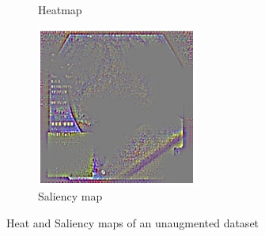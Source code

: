 \begin{figure}
\begin{subfigure}[t]{0.3\textwidth}
         \caption{Heatmap}
         \label{fig:sal2}
     \end{subfigure}     
     \hfill
     \begin{subfigure}[t]{0.3\textwidth}
         \centering
         \includegraphics[width=\textwidth]{methodology/figures/sal3.png}
         \caption{Saliency map}
         \label{fig:sal3}
     \end{subfigure}
     \caption{Heat and Saliency maps of an unaugmented dataset}
     \label{fig:Saliencymasks}
\end{figure}

